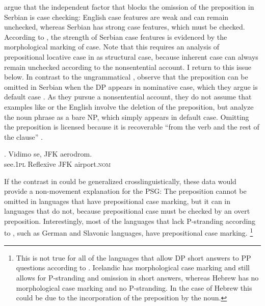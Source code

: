\citet{barton.progovac2005} argue that the independent factor that blocks the omission of the preposition in Serbian is case checking: English case features are weak and can remain unchecked, whereas Serbian has strong case features, which must be checked. According to \citeauthor{barton.progovac2005}, the strength of Serbian case features is evidenced by the morphological marking of case. Note that this requires an analysis of prepositional locative case in \Last[b] as structural case, because inherent case can always remain unchecked according to the nonsentential account. I return to this issue below. In contrast to the ungrammatical \Last[b], \citeauthor{barton.progovac2005} observe that the preposition can be omitted in Serbian when the DP appears in nominative case, which they argue is default case \Next. As they pursue a nonsentential account, they do not assume that examples like \Next or the English \Last[a] involve the deletion of the preposition, but analyze the noun phrase as a bare NP, which simply appears in default case. Omitting the preposition is licensed because it is recoverable ``from the verb and the rest of the clause'' \citep[89]{barton.progovac2005}.\largerpage[-1]

\exg. Vidimo se, JFK aerodrom.  \\
see.\textsc{1pl} Reflexive  JFK airport.\textsc{nom}\\
 

If the contrast in \LLast could be generalized crosslinguistically, these data would provide a non-movement explanation for the PSG: The preposition cannot be omitted in languages that have prepositional case marking, but it can in languages that do not, because prepositional case must be checked by an overt preposition. Interestingly, most of the languages that lack P-stranding according to \citet{merchant2004}, such as German and Slavonic languages, have prepositional case marking.%
%
\footnote{This is not true for all of the languages that allow DP short answers to PP questions according to \citet{merchant2004}. Icelandic has morphological case marking and still allows for P-stranding and omission in short answers, whereas Hebrew has no morphological case marking and no P-stranding. In the case of Hebrew this could be due to the incorporation of the preposition by the noun. %
}\afterfn%
%

